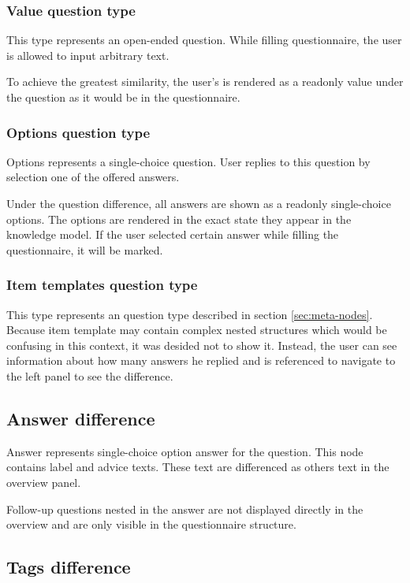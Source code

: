 \subsubsection*{Value question type}

This type represents an open-ended question.
While filling questionnaire, the user is allowed to input arbitrary text.

To achieve the greatest similarity, the user's is rendered as a readonly value under the question as it would be in the questionnaire.

\subsubsection*{Options question type}

Options represents a single-choice question.
User replies to this question by selection one of the offered answers.

Under the question difference, all answers are shown as a readonly single-choice options.
The options are rendered in the exact state they appear in the knowledge model.
If the user selected certain answer while filling the questionnaire, it will be marked.

\subsubsection*{Item templates question type}

This type represents an question type described in section \ref{sec:meta-nodes}.
Because item template may contain complex nested structures which would be confusing in this context, it was desided not to show it.
Instead, the user can see information about how many answers he replied and is referenced to navigate to the left panel to see the difference.

\subsection{Answer difference}

Answer represents single-choice option answer for the question.
This node contains label and advice texts.
These text are differenced as others text in the overview panel.

Follow-up questions nested in the answer are not displayed directly in the overview and are only visible in the questionnaire structure.

\subsection{Tags difference}

